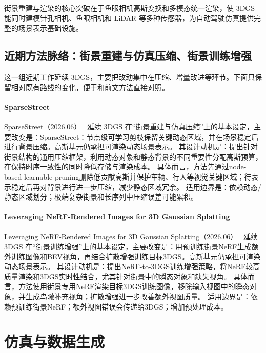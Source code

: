 \begin{takeaway}
街景重建与渲染的核心突破在于鱼眼相机高斯变换和多模态统一渲染，使 3DGS 能同时建模针孔相机、鱼眼相机和 LiDAR 等多种传感器，为自动驾驶仿真提供完整的场景表示基础设施。
\end{takeaway}


\subsection{近期方法脉络：街景重建与仿真压缩、街景训练增强}

这一组近期工作延续 3DGS，主要把改动集中在压缩、增量改进等环节。下面只保留相对既有路线的变化，便于和前文方法直接对照。

\paragraph{SparseStreet}
SparseStreet（2026.06）~\cite{2606_03909} 延续 3DGS 在“街景重建与仿真压缩”上的基本设定，主要改变是：SparseStreet：节点级可学习剪枝保留关键动态区域，并在场景稳定后进行背景压缩。高斯基元仍承担可渲染动态场景表示。
其设计动机是：提出针对街景结构的通用压缩框架，利用动态对象和静态背景的不同重要性分配高斯预算，在保持时序一致性的同时降低存储与渲染成本。
具体而言，方法先通过node-based learnable pruning删除低贡献高斯并保护车辆、行人等视觉关键区域；待表示稳定后再对背景进行进一步压缩，减少静态区域冗余。
适用边界是：依赖动态/静态区域划分；极端复杂街景和长序列中压缩误差可能累积。

\paragraph{Leveraging NeRF-Rendered Images for 3D Gaussian Splatting}
Leveraging NeRF-Rendered Images for 3D Gaussian Splatting（2026.06）~\cite{2606_09034} 延续 3DGS 在“街景训练增强”上的基本设定，主要改变是：用预训练街景NeRF生成额外训练图像和BEV视角，再结合扩散增强训练目标3DGS。高斯基元仍承担可渲染动态场景表示。
其设计动机是：提出NeRF-to-3DGS训练增强策略，将NeRF较高质量渲染和3DGS实时性结合，尤其针对街景中的瞬态对象和缺失视角。
具体而言，方法使用街景专用NeRF渲染目标3DGS训练图像，移除输入视图中的瞬态对象，并生成鸟瞰补充视角；扩散增强进一步改善额外视图质量。
适用边界是：依赖预训练街景NeRF；额外视图错误会传递给3DGS；增加预处理成本。
\section{仿真与数据生成}
\label{sec:18_2}

